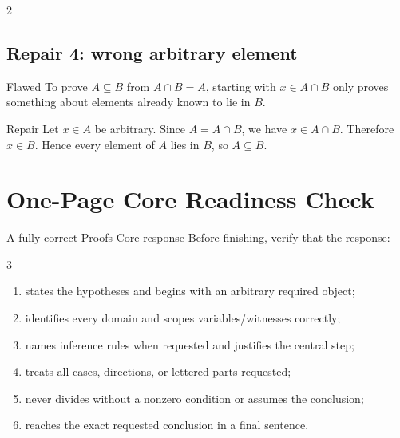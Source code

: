 \documentclass[10pt]{article}
\begin{document}
\begin{multicols}{2}
\subsection*{Repair 4: wrong arbitrary element}

\begin{warningbox}{Flawed}
To prove $A\subseteq B$ from $A\cap B=A$, starting with $x\in A\cap B$ only
proves something about elements already known to lie in $B$.
\end{warningbox}

\begin{workedbox}{Repair}
Let $x\in A$ be arbitrary. Since $A=A\cap B$, we have $x\in A\cap B$.
Therefore $x\in B$. Hence every element of $A$ lies in $B$, so $A\subseteq B$.
\end{workedbox}
\end{multicols}

\clearpage
\section*{One-Page Core Readiness Check}

\begin{checklistbox}{A fully correct Proofs Core response}
\small
Before finishing, verify that the response:
\begin{multicols}{3}
\begin{enumerate}
  \item states the hypotheses and begins with an arbitrary required object;
  \item identifies every domain and scopes variables/witnesses correctly;
  \item names inference rules when requested and justifies the central step;
  \item treats all cases, directions, or lettered parts requested;
  \item never divides without a nonzero condition or assumes the conclusion;
  \item reaches the exact requested conclusion in a final sentence.
\end{enumerate}
\end{multicols}
\end{checklistbox}
\end{document}
